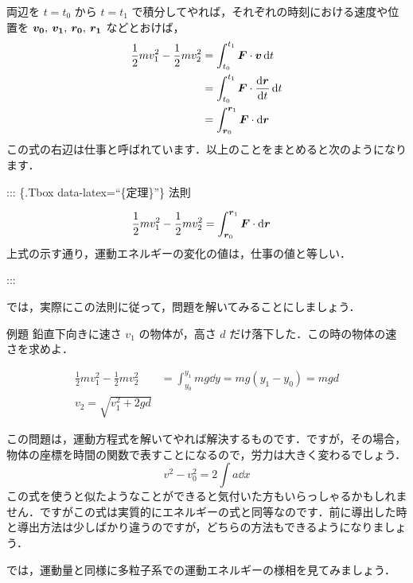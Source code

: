 \documentclass[
  b4paperpaper,
  xelatex,ja=standard]{bxjsbook}
\begin{document}
両辺を \(t=t_0\) から \(t=t_1\)
で積分してやれば，それぞれの時刻における速度や位置を
\(\vb*{v_0},\:\vb*{v_1},\:\vb*{r_0},\:\vb*{r_1}\) などとおけば，
\begin{align*}
\frac{1}{2}mv_1^2-\frac{1}{2}mv_2^2&=\int_{t_0}^{t_1}\boldsymbol{F}\cdot\vb*{v}\dd{t}\\
&=\int_{t_0}^{t_1}\boldsymbol{F}\cdot\dv{\vb*{r}}{t}\dd{t}\\
&=\int_{\vb*{r}_0}^{\vb*{r}_1}\boldsymbol{F}\cdot \dd{\vb*{r}}
\end{align*}
この式の右辺は仕事と呼ばれています．以上のことをまとめると次のようになります．

::: \{.Tbox data-latex=``\{定理\}''\} 法則

\begin{align*}
\frac{1}{2}mv_1^2-\frac{1}{2}mv_2^2&=\int_{\vb*{r}_0}^{\vb*{r}_1}\boldsymbol{F}\cdot \dd{\vb*{r}}
\end{align*}
上式の示す通り，運動エネルギーの変化の値は，仕事の値と等しい．

:::

では，実際にこの法則に従って，問題を解いてみることにしましょう．

\begin{Rbox}{例題}
鉛直下向きに速さ \(v_1\) の物体が，高さ \(d\)
だけ落下した．この時の物体の速さを求めよ．

\end{Rbox}


\begin{align*}
\frac{1}{2}mv_1^2-\frac{1}{2}mv_2^2&=\int_{y_0}^{y_1}mg \dd{y} = mg(y_1-y_0) = mgd\\
v_2=\sqrt{v_1^2+2gd}
\end{align*}

この問題は，運動方程式を解いてやれば解決するものです．ですが，その場合，物体の座標を時間の関数で表すことになるので，労力は大きく変わるでしょう．
\[v^2-v_0^2=2\int a \dd{x}\]
この式を使うと似たようなことができると気付いた方もいらっしゃるかもしれません．ですがこの式は実質的にエネルギーの式と同等なのです．前に導出した時と導出方法は少しばかり違うのですが，どちらの方法もできるようになりましょう．

では，運動量と同様に多粒子系での運動エネルギーの様相を見てみましょう．
\end{document}
